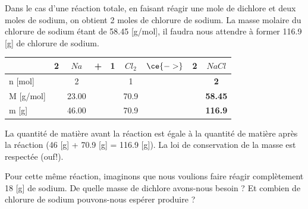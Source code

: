\documentclass[
  11pt,
  french,
  a4paper,
  openany]{book}
\begin{document}
Dans le cas d'une réaction totale, en faisant réagir une mole de dichlore et deux moles de sodium, on obtient 2 moles de chlorure de sodium. La masse molaire du chlorure de sodium étant de 58.45 {[}g/mol{]}, il faudra nous attendre à former 116.9 {[}g{]} de chlorure de sodium.

\begin{longtable}[]{@{}lcccccccc@{}}
\toprule
& 2 & \(Na\) & + & 1 & \(Cl_2\) & \(\ce{->}\) & 2 & \(NaCl\)\tabularnewline
\midrule
\endhead
n {[}mol{]} & & 2 & & & 1 & & & \textbf{2}\tabularnewline
M {[}g/mol{]} & & 23.00 & & & 70.9 & & & \textbf{58.45}\tabularnewline
m {[}g{]} & & 46.00 & & & 70.9 & & & \textbf{116.9}\tabularnewline
\bottomrule
\end{longtable}

La quantité de matière avant la réaction est égale à la quantité de matière après la réaction (46 {[}g{]} + 70.9 {[}g{]} = 116.9 {[}g{]}). La loi de conservation de la masse est respectée (ouf!).

\begin{Exercise}

Pour cette même réaction, imaginons que nous voulions faire réagir complètement 18 {[}g{]} de sodium. De quelle masse de dichlore avons-nous besoin ? Et combien de chlorure de sodium pouvons-nous espérer produire ?



\end{Exercise}
\end{document}
